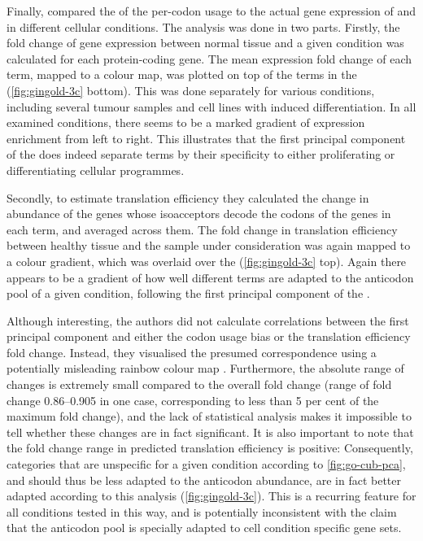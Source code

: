 Finally, \citet{Gingold:2014} compared the \pca of the per-\go codon usage to
the actual gene expression of \mrna[s] and \trna[s] in different cellular
conditions. The analysis was done in two parts. Firstly, the fold change of gene
expression between normal tissue and a given condition was calculated for each
protein-coding gene. The mean expression fold change of each \go term, mapped to
a colour map, was plotted on top of the \go terms in the \pca
(\cref{fig:gingold-3c} bottom). This was done separately for various
conditions, including several tumour samples and cell lines with induced
differentiation. In all examined conditions, there seems to be a marked gradient
of \mrna expression enrichment from left to right. This illustrates that the
first principal component of the \pca does indeed separate \go terms by their
specificity to either proliferating or differentiating cellular
programmes.

Secondly, to estimate translation efficiency they calculated the change in
abundance of the \trna genes whose isoacceptors decode the codons of the genes
in each \go term, and averaged across them. The fold change in translation
efficiency between healthy tissue and the sample under consideration was again
mapped to a colour gradient, which was overlaid over the \pca
(\cref{fig:gingold-3c} top). Again there appears to be a gradient of how
well different \go terms are adapted to the \trna anticodon pool of a given
condition, following the first principal component of the \pca.

Although interesting, the authors did not calculate correlations between the
first principal component and either the codon usage bias or the translation
efficiency fold change. Instead, they visualised the presumed correspondence
using a potentially misleading rainbow colour map \citep{Borland:2007}.
Furthermore, the absolute range of changes is extremely small compared to the
overall fold change (range of fold change \numrange{0.86}{0.905} in one case,
corresponding to less than \num{5} per cent of the maximum fold change), and the
lack of statistical analysis makes it impossible to tell whether these changes
are in fact significant. It is also important to note that the fold change range
in predicted translation efficiency is positive: Consequently, \go categories
that are unspecific for a given condition according to \cref{fig:go-cub-pca},
and should thus be less adapted to the \trna anticodon abundance, are in fact
better adapted according to this analysis (\cref{fig:gingold-3c}). This is a
recurring feature for all conditions tested in this way, and is potentially
inconsistent with the claim that the \trna anticodon pool is specially adapted
to cell condition specific gene sets.

